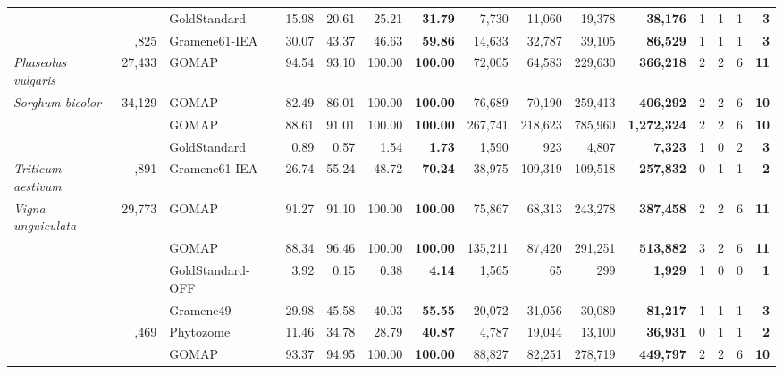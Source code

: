 \documentclass[utf8]{frontiersSCNS}
\begin{document}
\begin{table}[t]
{\begin{threeparttable}
\begin{tabular}{lrlrrr>{\bfseries}r|rrr>{\bfseries}r|rrr>{\bfseries}r}
 &  & GoldStandard & 15.98 & 20.61 & 25.21 & 31.79 & 7,730 & 11,060 & 19,378 & 38,176 & 1 & 1 & 1 & 3\\

\rowcolor{gray!6}  \multirow{-3}{*}{\raggedright\arraybackslash \textit{Oryza sativa}} & \multirow{-3}{*}{\raggedleft\arraybackslash 35,825} & Gramene61-IEA & 30.07 & 43.37 & 46.63 & 59.86 & 14,633 & 32,787 & 39,105 & 86,529 & 1 & 1 & 1 & 3\\
\cmidrule{1-15}
\textit{Phaseolus vulgaris} & 27,433 & GOMAP & 94.54 & 93.10 & 100.00 & 100.00 & 72,005 & 64,583 & 229,630 & 366,218 & 2 & 2 & 6 & 11\\
\cmidrule{1-15}
\rowcolor{gray!6}  \textit{Sorghum bicolor} & 34,129 & GOMAP & 82.49 & 86.01 & 100.00 & 100.00 & 76,689 & 70,190 & 259,413 & 406,292 & 2 & 2 & 6 & 10\\
\cmidrule{1-15}
 &  & GOMAP & 88.61 & 91.01 & 100.00 & 100.00 & 267,741 & 218,623 & 785,960 & 1,272,324 & 2 & 2 & 6 & 10\\

\rowcolor{gray!6}   &  & GoldStandard & 0.89 & 0.57 & 1.54 & 1.73 & 1,590 & 923 & 4,807 & 7,323 & 1 & 0 & 2 & 3\\

\multirow{-3}{*}{\raggedright\arraybackslash \textit{Triticum aestivum}} & \multirow{-3}{*}{\raggedleft\arraybackslash 107,891} & Gramene61-IEA & 26.74 & 55.24 & 48.72 & 70.24 & 38,975 & 109,319 & 109,518 & 257,832 & 0 & 1 & 1 & 2\\
\cmidrule{1-15}
\rowcolor{gray!6}  \textit{Vigna unguiculata} & 29,773 & GOMAP & 91.27 & 91.10 & 100.00 & 100.00 & 75,867 & 68,313 & 243,278 & 387,458 & 2 & 2 & 6 & 11\\
\cmidrule{1-15}
 &  & GOMAP & 88.34 & 96.46 & 100.00 & 100.00 & 135,211 & 87,420 & 291,251 & 513,882 & 3 & 2 & 6 & 11\\

\rowcolor{gray!6}   &  & GoldStandard-OFF & 3.92 & 0.15 & 0.38 & 4.14 & 1,565 & 65 & 299 & 1,929 & 1 & 0 & 0 & 1\\

 &  & Gramene49 & 29.98 & 45.58 & 40.03 & 55.55 & 20,072 & 31,056 & 30,089 & 81,217 & 1 & 1 & 1 & 3\\

\rowcolor{gray!6}  \multirow{-4}{*}{\raggedright\arraybackslash \textit{Zea mays} B73.v3} & \multirow{-4}{*}{\raggedleft\arraybackslash 39,469} & Phytozome & 11.46 & 34.78 & 28.79 & 40.87 & 4,787 & 19,044 & 13,100 & 36,931 & 0 & 1 & 1 & 2\\
\cmidrule{1-15}
 &  & GOMAP & 93.37 & 94.95 & 100.00 & 100.00 & 88,827 & 82,251 & 278,719 & 449,797 & 2 & 2 & 6 & 10\\


\end{tabular}
\end{threeparttable}}
\end{table}
\end{document}
